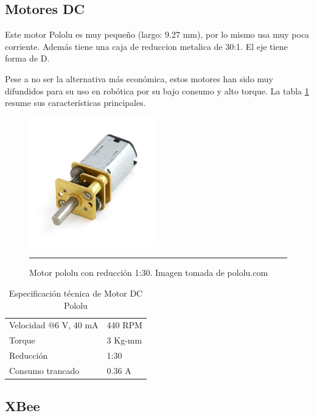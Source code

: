 \subsection{Motores DC}

Este motor Pololu es muy pequeño (largo: 9.27 mm), por lo mismo usa muy poca corriente. Además tiene una caja de reduccion metalica de 30:1. El eje tiene forma de D.

Pese a no ser la alternativa más económica, estos motores han sido muy difundidos para su uso en robótica por su bajo consumo y alto torque. La tabla \ref{table:Motor} resume sus características principales.

\begin{figure}[htbp]
	\centering
		\includegraphics[width=0.5\textwidth]{./Figures/MODI/Motorpololu.jpg}
		\rule{35em}{0.5pt}
	\caption[MotorDC]{Motor pololu con reducción 1:30. Imagen tomada de pololu.com}
	\label{fig:MotorDC}
\end{figure}

\begin{table}
    \begin{tabular}{l|l}
    Velocidad @6 V, 40 mA &  440 RPM \\
    Torque                & 3 Kg-mm  \\
    Reducción             & 1:30     \\
    Consumo trancado      & 0.36 A   \\
    \end{tabular}
        \caption[Motor]{Especificación técnica de Motor DC Pololu}
	\label{table:Motor}
\end{table}

\subsection{XBee}

